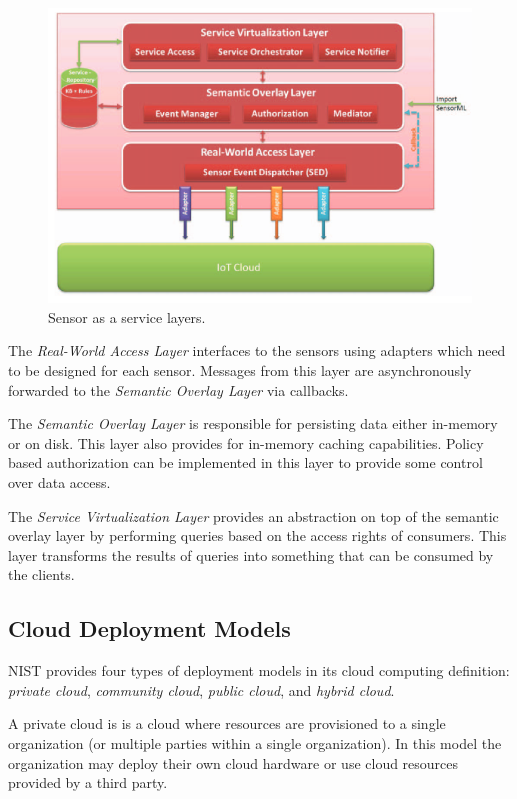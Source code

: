\documentclass[]{article}
\begin{document}
\begin{figure}
    \centering
    \includegraphics[width=1.0\linewidth]{img/sensor-as-a-service}
    \caption[Sensor as a service layers.]{Sensor as a service layers.\cite{alam_senaas_2010}}
    \label{fig:sensor-as-a-service}
\end{figure}

The \textit{Real-World Access Layer} interfaces to the sensors using adapters which need to be designed for each sensor. Messages from this layer are asynchronously forwarded to the \textit{Semantic Overlay Layer} via callbacks.

The \textit{Semantic Overlay Layer} is responsible for persisting data either in-memory or on disk. This layer also provides for in-memory caching capabilities. Policy based authorization can be implemented in this layer to provide some control over data access.

The \textit{Service Virtualization Layer} provides an abstraction on top of the semantic overlay layer by performing queries based on the access rights of consumers. This layer transforms the results of queries into something that can be consumed by the clients.


\subsection{Cloud Deployment Models} \label{ssec:cloud-deployment-models}
NIST\cite{mell2011nist} provides four types of deployment models in its cloud computing definition: \textit{private cloud}, \textit{community cloud}, \textit{public cloud}, and \textit{hybrid cloud}.

A private cloud is is a cloud where resources are provisioned to a single organization (or multiple parties within a single organization). In this model the organization may deploy their own cloud hardware or use cloud resources provided by a third party.
\end{document}

